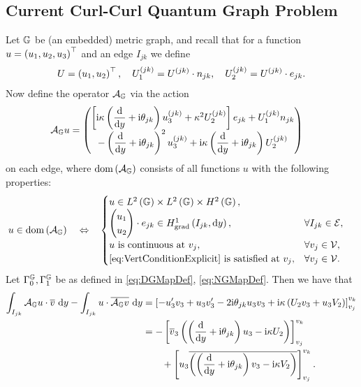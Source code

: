 \documentclass[11pt]{report}
\newcommand{\dgmap}{\dmap^{\graph}}
\newcommand{\ngmap}{\nmap^{\graph}}
\newcommand{\ag}{\mathcal{A}_\graph}
\begin{document}
\subsection*{Current Curl-Curl Quantum Graph Problem}
Let $\mathbb{G}$ be (an embedded) metric graph, and recall that for a function $u=\left( u_1,u_2,u_3 \right)^\top$ and an edge $I_{jk}$ we define
\begin{align*}
	U = \left( u_1, u_2 \right)^\top, \quad U_1^{(jk)} = U^{(jk)}\cdot n_{jk}, \quad U_2^{(jk)} = U^{(jk)}\cdot e_{jk}.
\end{align*}
Now define the operator $\ag$ via the action
\begin{align*}
	\ag u &= 
	\begin{pmatrix}
		\sqbracs{ \rmi\wavenumber\bracs{\diff{}{y} + \rmi\qm_{jk} }u_3^{(jk)} + \wavenumber^2 U_2^{(jk)} }e_{jk}
		+ U_1^{(jk)} n_{jk} \\
		- \bracs{\diff{}{y} + \rmi\qm_{jk} }^2 u_3^{(jk)} + \rmi\wavenumber \bracs{\diff{}{y} + \rmi\qm_{jk} }U_2^{(jk)}
	\end{pmatrix}
\end{align*}
on each edge, where $\mathrm{dom}\bracs{\ag}$ consists of all functions $u$ with the following properties:
\begin{align*}
	u\in\mathrm{dom}\bracs{\ag} \quad\Leftrightarrow\quad &
	\begin{cases}
	u\in L^2\bracs{\graph}\times L^2\bracs{\graph}\times H^2\bracs{\graph}, \\
	\begin{pmatrix} u_1 \\ u_2 \end{pmatrix}\cdot e_{jk}\in \gradSob{I_{jk}}{y}, & \forall I_{jk}\in\edgeSet, \\
	u \text{ is continuous at } v_j, & \forall v_j\in\vertSet, \\
	\text{\eqref{eq:VertConditionExplicit} is satisfied at } v_j, & \forall v_j\in\vertSet.
	\end{cases}
\end{align*}
Let $\dgmap, \ngmap$ be as defined in \eqref{eq:DGMapDef}, \eqref{eq:NGMapDef}.
Then we have that
\begin{align*}
	\integral{I_{jk}}{ \ag u \cdot \overline{v} }{y} - \integral{I_{jk}}{ u \cdot \overline{\ag v} }{y}
	&= \sqbracs{ -u'_3 v_3 + u_3 v_3' - 2\rmi\qm_{jk}u_3 v_3 + \rmi\wavenumber\bracs{U_2 v_3 + u_3 V_2} }_{v_j}^{v_k} \\
	&= -\sqbracs{ \overline{v}_3\bracs{ \bracs{\diff{}{y} + \rmi\qm_{jk} }u_3 - \rmi\wavenumber U_2 } }_{v_j}^{v_k} \\
	&\qquad + \sqbracs{ u_3\overline{\bracs{ \bracs{\diff{}{y} + \rmi\qm_{jk} }v_3 - \rmi\wavenumber V_2 }} }_{v_j}^{v_k}.
\end{align*}
\end{document}
